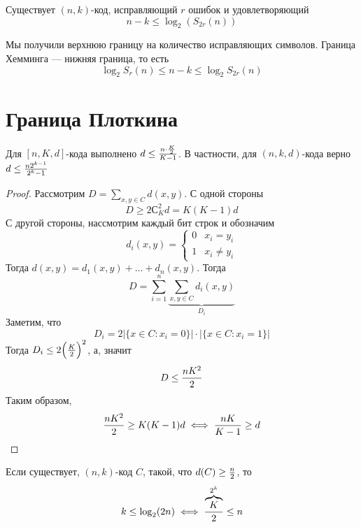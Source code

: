 \begin{corollary}
Существует $(n,k)$-код, исправляющий $r$ ошибок и удовлетворяющий
$$n-k \le \log_2(S_{2r}(n))$$
\end{corollary}

\begin{remark}
Мы получили верхнюю границу на количество исправляющих символов. Граница 
Хемминга --- нижняя граница, то есть
$$\log_2 S_r(n) \le n-k \le \log_2 S_{2r}(n)$$
\end{remark}

\section{Граница Плоткина}

\begin{theorem}
Для $[n,K,d]$-кода выполнено $d \le {n \cdot {K \over 2} \over K-1}$.
В частности, для $(n,k,d)$-кода верно $d \le {n 2^{k-1} \over 2^k - 1}$
\end{theorem}

\begin{proof}
Рассмотрим $D = \sum\limits_{x,y \in C} d(x,y)$. С одной стороны
$$D \ge 2 С_{K}^2 d = K (K-1) d$$
С другой стороны, нассмотрим каждый бит строк и обозначим
$$d_i (x,y) = \begin{cases} 0 & x_i = y_i \\ 1 & x_i \neq y_i \end{cases}$$
Тогда $d(x,y) = d_1(x,y) + \ldots + d_n(x,y)$. Тогда
$$D = \sum\limits_{i=1}^n \underbrace{\sum\limits_{x,y \in C} d_i(x,y)}_{D_i}$$
Заметим, что $$D_i = 2|\{x\in C \colon x_i = 0\}| \cdot |\{x \in C \colon x_i = 1\}|$$
Тогда $D_i \le 2\Big({K \over 2}\Big)^2$, а, значит $$D \le {n K^2 \over 2}$$
Таким образом, $${n K^2 \over 2} \ge K(K-1)d \iff {n K \over K-1} \ge d$$
\end{proof}

\begin{theorem}
\label{theorem6}
Если существует, $(n,k)$-код $C$, такой, что $d(C) \ge {n \over 2}$,
то $$k \le \log_2 (2n) \iff {\overbrace{K}^{2^k} \over 2} \le n$$
\end{theorem}


